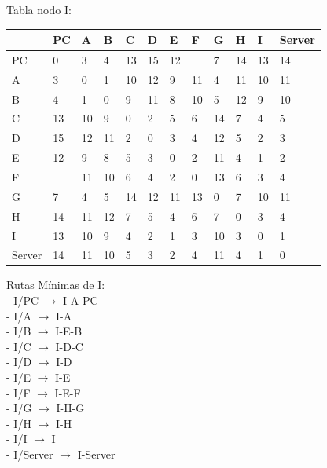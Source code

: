 \documentclass[a4paper]{article}
\begin{document}
\begin{table}[ht]
Tabla nodo I:\\
\begin{tabular}{|l|l|l|l|l|l|l|l|l|l|l|l|}
\hline
       & PC & A  & B & C & D & E & F & G & H & I  & Server \\ \hline
PC     & 0  & 3  & 4 & 13& 15& 12&   & 7 & 14& 13 & 14     \\ \hline
A      & 3  & 0  & 1 & 10& 12& 9 & 11& 4 & 11& 10 & 11     \\ \hline
B      & 4  & 1  & 0 & 9 & 11& 8 & 10& 5 & 12& 9  & 10     \\ \hline
C      & 13 & 10 & 9 & 0 & 2 & 5 & 6 & 14& 7 & 4  & 5      \\ \hline
D      & 15 & 12 & 11& 2 & 0 & 3 & 4 & 12& 5 & 2  & 3      \\ \hline
E      & 12 & 9  & 8 & 5 & 3 & 0 & 2 & 11& 4 & 1  & 2      \\ \hline
F      &    & 11 & 10& 6 & 4 & 2 & 0 & 13& 6 & 3  & 4      \\ \hline
G      & 7  & 4  & 5 & 14& 12& 11& 13& 0 & 7 & 10 & 11     \\ \hline
H      & 14 & 11 & 12& 7 & 5 & 4 & 6 & 7 & 0 & 3  & 4      \\ \hline
I      & 13 & 10 & 9 & 4 & 2 & 1 & 3 & 10& 3 & 0  & 1      \\ \hline
Server & 14 & 11 & 10& 5 & 3 & 2 & 4 & 11& 4 & 1  & 0      \\ \hline
\end{tabular}

Rutas Mínimas de I:\\
-	I/PC  $\rightarrow$  I-A-PC\\
-	I/A  $\rightarrow$  I-A\\
-	I/B  $\rightarrow$  I-E-B\\
-	I/C  $\rightarrow$ I-D-C\\
-	I/D  $\rightarrow$  I-D\\
-	I/E  $\rightarrow$  I-E\\
-	I/F  $\rightarrow$ I-E-F\\
-	I/G  $\rightarrow$  I-H-G\\
-	I/H  $\rightarrow$  I-H\\
-	I/I  $\rightarrow$  I\\
-	I/Server  $\rightarrow$  I-Server\\
\end{table}

\clearpage
\end{document}
